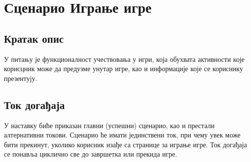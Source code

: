 \section{Сценарио Играње игре}

\subsection{Кратак опис}
У питању је функционалност учествовања у игри, која обухвата активности које корисцник може да предузме унутар игре, као и информације које се кориснику презентују.

\subsection{Ток догађаја}
У наставку биће приказан главни (успешни) сценарио, као и престали алтернативни токови. Сценарио ће имати јединствени ток, при чему увек може бити прекинут, уколико корисник изађе са странице за играње игре. Ток догађаја се понавља циклично све до завршетка или прекида игре.

